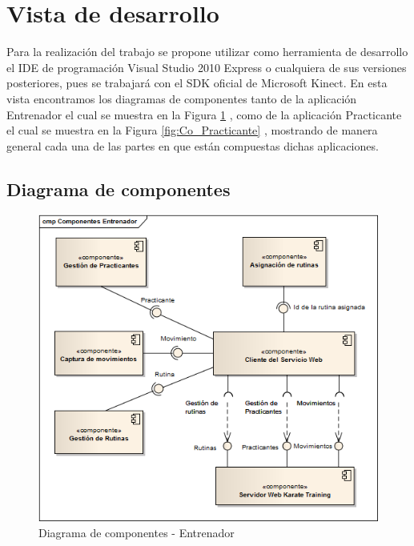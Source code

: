 \section{Vista de desarrollo}

Para la realización del trabajo se propone utilizar como herramienta de desarrollo el IDE de programación Visual Studio 2010 Express o cualquiera de sus versiones posteriores, pues se trabajará con el SDK oficial de Microsoft Kinect.
En esta vista encontramos los diagramas de componentes tanto de la aplicación Entrenador el cual se muestra en la Figura \ref{fig:Co_Entrenador} , como de la aplicación Practicante el cual se muestra en la Figura \ref{fig:Co_Practicante} , mostrando de manera general cada una de las partes en que están compuestas dichas aplicaciones.

\subsection{Diagrama de componentes}

\begin{figure}[H]
	\begin{center}
		\includegraphics[scale=0.8]{./Figuras/Arquitectura/Componentes_Entrenador}
	\end{center}
	\caption{Diagrama de componentes - Entrenador}
	\label{fig:Co_Entrenador}
\end{figure}

